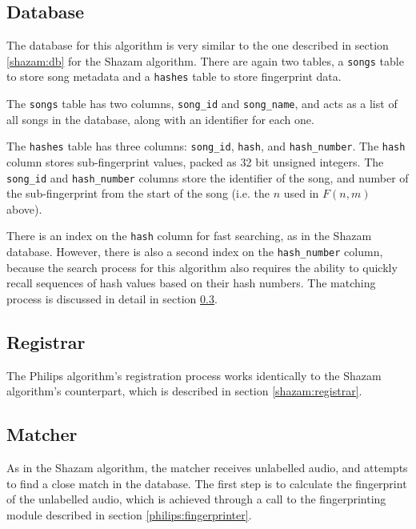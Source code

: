 \documentclass[12pt,a4paper,twoside,openright]{report}
\begin{document}
\subsection{Database}

The database for this algorithm is very similar to the one described in section \ref{shazam:db} for the Shazam algorithm. There are again two tables, a \lstinline{songs} table to store song metadata and a \lstinline{hashes} table to store fingerprint data.

The \lstinline{songs} table has two columns, \lstinline{song_id} and \lstinline{song_name}, and acts as a list of all songs in the database, along with an identifier for each one.

The \lstinline{hashes} table has three columns: \lstinline{song_id}, \lstinline{hash}, and \lstinline{hash_number}. The \lstinline{hash} column stores sub-fingerprint values, packed as 32 bit unsigned integers. The \lstinline{song_id} and \lstinline{hash_number} columns store the identifier of the song, and number of the sub-fingerprint from the start of the song (i.e. the $n$ used in $F(n,m)$ above).

There is an index on the \lstinline{hash} column for fast searching, as in the Shazam database. However, there is also a second index on the \lstinline{hash_number} column, because the search process for this algorithm also requires the ability to quickly recall sequences of hash values based on their hash numbers. The matching process is discussed in detail in section \ref{philips:matcher}.


\subsection{Registrar}

The Philips algorithm's registration process works identically to the Shazam algorithm's counterpart, which is described in section \ref{shazam:registrar}.


\subsection{Matcher}
\label{philips:matcher}

As in the Shazam algorithm, the matcher receives unlabelled audio, and attempts to find a close match in the database. The first step is to calculate the fingerprint of the unlabelled audio, which is achieved through a call to the fingerprinting module described in section \ref{philips:fingerprinter}.
\end{document}

